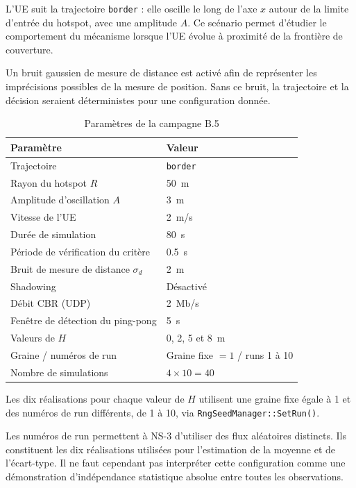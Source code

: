L'UE suit la trajectoire \texttt{border} : elle oscille le long de l'axe
$x$ autour de la limite d'entrée du hotspot, avec une amplitude $A$.
Ce scénario permet d'étudier le comportement du mécanisme lorsque l'UE
évolue à proximité de la frontière de couverture.

Un bruit gaussien de mesure de distance est activé afin de représenter
les imprécisions possibles de la mesure de position. Sans ce bruit,
la trajectoire et la décision seraient déterministes pour une
configuration donnée.

\begin{table}[H]
\centering
\caption{Paramètres de la campagne B.5}
\label{tab:b5_params}
\begin{tabular}{ll}
\toprule
\textbf{Paramètre} & \textbf{Valeur}\\
\midrule
Trajectoire & \texttt{border}\\
Rayon du hotspot $R$ & \SI{50}{m}\\
Amplitude d'oscillation $A$ & \SI{3}{m}\\
Vitesse de l'UE & \SI{2}{m/s}\\
Durée de simulation & \SI{80}{s}\\
Période de vérification du critère & \SI{0,5}{s}\\
Bruit de mesure de distance $\sigma_d$ & \SI{2}{m}\\
Shadowing & Désactivé\\
Débit CBR (UDP) & \SI{2}{Mb/s}\\
Fenêtre de détection du ping-pong & \SI{5}{s}\\
Valeurs de $H$ & 0, 2, 5 et \SI{8}{m}\\
Graine / numéros de run & Graine fixe $=1$ / runs 1 à 10\\
Nombre de simulations & $4\times 10=40$\\
\bottomrule
\end{tabular}
\end{table}

Les dix réalisations pour chaque valeur de $H$ utilisent une graine
fixe égale à 1 et des numéros de run différents, de 1 à 10, via
\texttt{RngSeedManager::SetRun()}.

Les numéros de run permettent à NS-3 d'utiliser des flux aléatoires
distincts. Ils constituent les dix réalisations utilisées pour
l'estimation de la moyenne et de l'écart-type. Il ne faut cependant
pas interpréter cette configuration comme une démonstration
d'indépendance statistique absolue entre toutes les observations.

